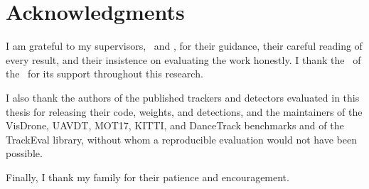 \chapter*{Acknowledgments}
\thispagestyle{plain}
I am grateful to my supervisors, \SupervisorOne\ and \SupervisorTwo, for their guidance, their careful reading of every result, and their insistence on evaluating the work honestly. I thank the \ThesisDepartment\ of the \ThesisInstitution\ for its support throughout this research.

I also thank the authors of the published trackers and detectors evaluated in this thesis for releasing their code, weights, and detections, and the maintainers of the VisDrone, UAVDT, MOT17, KITTI, and DanceTrack benchmarks and of the TrackEval library, without whom a reproducible evaluation would not have been possible.

Finally, I thank my family for their patience and encouragement.
